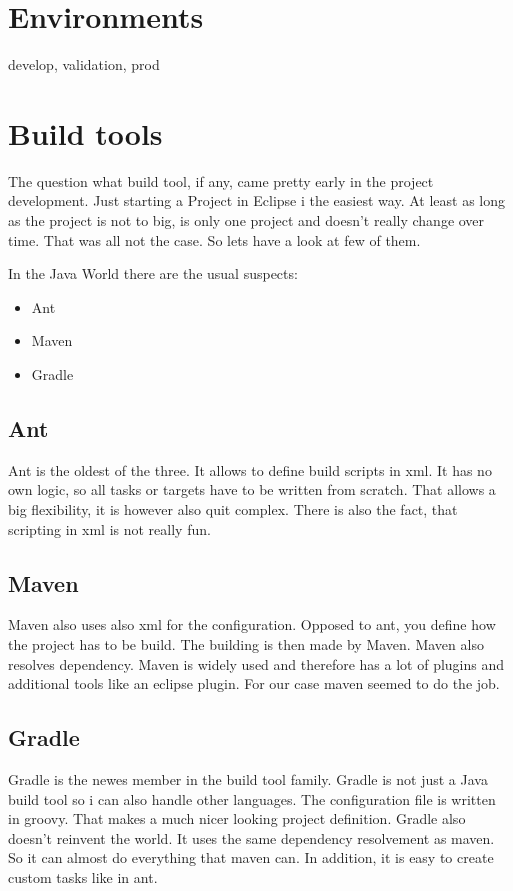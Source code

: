 \documentclass[paper=a4,twoside=false,BCOR=0mm,DIV=calc,fontsize=12pt]{scrartcl}
\begin{document}
\section{Environments}
develop, validation, prod

\section{Build tools}
The question what build tool, if any, came pretty early in the project development. Just starting a Project in Eclipse i the easiest way. 
At least as long as the project is not to big, is only one project and doesn't really change over time. That was all not the case. So lets have a look at few of them. 

In the Java World there are the usual suspects:
\begin{itemize}
 \item Ant
 \item Maven
 \item Gradle
\end{itemize}

\subsection{Ant}
Ant is the oldest of the three. It allows to define build scripts in xml. 
It has no own logic, so all tasks or targets have to be written from scratch.
That allows a big flexibility, it is however also quit complex. There is also the fact,
that scripting in xml is not really fun.


\subsection{Maven}
Maven also uses also xml for the configuration. Opposed to ant, you define how the project has to be build. The building is then
made by Maven. Maven also resolves dependency. Maven is widely used and therefore has a lot of plugins and additional tools like an eclipse plugin. For our case maven seemed to do the job.


\subsection{Gradle}
Gradle is the newes member in the build tool family. Gradle is not just a Java build tool so i can also handle other languages. The configuration file is written in groovy. That makes a much nicer looking project definition.
Gradle also doesn't reinvent the world. It uses the same dependency resolvement as maven. So it can almost do everything that maven can. In addition, it is easy to create custom tasks like in ant.
\end{document}
